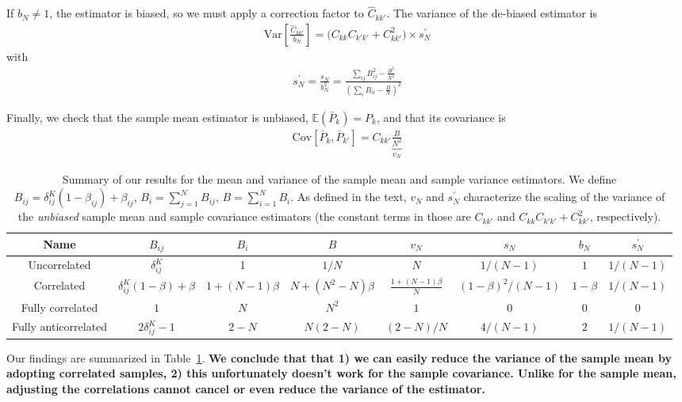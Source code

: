 \documentclass{aastex6}
\newcommand{\eqn}[1]{\begin{eqnarray}#1\end{eqnarray}}
\begin{document}
If $b_N\neq 1$, the estimator is biased, so we must apply a correction factor to $\hat{C}_{kk'}$.
The variance of the de-biased estimator is
\eqn{
	 \mathrm{Var}\left[ \frac{\hat{C}_{kk'}}{b_N}\right]  = \bigl(C_{kk}C_{k'k'} + C_{kk'}^2 \bigr) \times s_N^\prime  \label{ref:samplecovariancevariance}
}
with 
\eqn{
	s_N^\prime  = \frac{s_N}{b^2_N} =  \frac{ \sum_{ij} B_{ij}^2  - \frac{B^2}{N^2}}{ \left(\sum_i B_{ii} - \frac{B}{N}\right)^2 }
	}

Finally, we check that the sample mean estimator is unbiased, $\mathbb{E}(\bar{P}_k) = P_k$, and that its covariance is
\eqn{
	\mathrm{Cov}[\bar{P}_k, \bar{P}_{k'}] = C_{kk'} \underbrace{ \frac{B}{N^2} }_{v_N}
}

\begin{table}\centering
\begin{tabular}{|c|c|c|c|c|c|c|c|}
	\hline	Name	& $B_{ij}$	&	$B_{i}$	&	$B$	&	$v_N$	&	$s_N $ 	&	$b_N$	&	$s_N^\prime$	\\\hline
	Uncorrelated	&$ \delta^K_{ij}$		&	1	&	$1/N$	&	$N$	&	$1/(N-1)$	&	$1$	&	$1/(N-1)$	\\
	Correlated	&$\delta^K_{ij}(1-\beta) + \beta$		&	$1 + (N-1)\beta$	&	$N + (N^2-N)\beta$	&	$\frac{1 + (N-1)\beta}{N}$	&	$(1-\beta)^2/(N-1)$	&	$1-\beta$	&	$1/(N-1)$	\\
	Fully correlated	&$ 1$		&	$N$	&	$N^2$	&	$1$	&	$0$	&$0$		&	$0$	\\
	Fully anticorrelated	&$2 \delta^K_{ij} - 1$		&	$2-N$	&	$N(2-N)$	&	$(2-N)/N$	&	$4/(N-1)$	&	$2$	&	$1/(N-1)$	\\
	\hline
\end{tabular}	
\caption{Summary of our results for the mean and variance of the sample mean and sample variance estimators. We define $B_{ij} =  \delta^K_{ij}(1-\beta_{ij}) + \beta_{ij}$, $B_i=\sum_{j=1}^NB_{ij}$, $B=\sum_{i=1}^NB_{i}$. As defined in the text, $v_N$ and $s_N^\prime$ characterize the scaling of the variance of the \textit{unbiased} sample mean and sample covariance estimators (the constant terms in those are $C_{kk'}$ and $C_{kk}C_{k'k'} + C_{kk'}^2$, respectively). 
}
\label{table:correlateddrawbiasesandvariances}
\end{table}
 
Our findings are summarized in Table~\ref{table:correlateddrawbiasesandvariances}. \textbf{We conclude that that 1) we can easily reduce the variance of the sample mean by adopting correlated samples, 2) this unfortunately doesn't work for the sample covariance. Unlike for the sample mean, adjusting the correlations cannot cancel or even reduce the variance of the estimator.}
\end{document}
